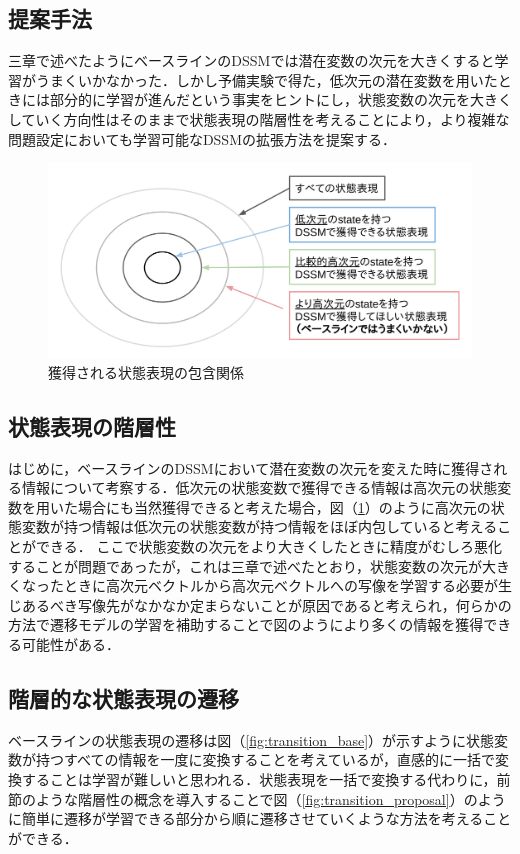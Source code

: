\documentclass[10pt, twocolumn]{jarticle}
\begin{document}
\subsection{提案手法}
三章で述べたようにベースラインのDSSMでは潜在変数の次元を大きくすると学習がうまくいかなかった．しかし予備実験で得た，低次元の潜在変数を用いたときには部分的に学習が進んだという事実をヒントにし，状態変数の次元を大きくしていく方向性はそのままで状態表現の階層性を考えることにより，より複雑な問題設定においても学習可能なDSSMの拡張方法を提案する．

\begin{figure}[tp]
  \begin{center}
    \includegraphics[width=\linewidth]{./figures/hierarchical.png}
    \caption{獲得される状態表現の包含関係}
    \label{fig:hierarchical}
  \end{center}
\end{figure}

\subsection{状態表現の階層性}
はじめに，ベースラインのDSSMにおいて潜在変数の次元を変えた時に獲得される情報について考察する．低次元の状態変数で獲得できる情報は高次元の状態変数を用いた場合にも当然獲得できると考えた場合，図（\ref{fig:hierarchical}）のように高次元の状態変数が持つ情報は低次元の状態変数が持つ情報をほぼ内包していると考えることができる．
ここで状態変数の次元をより大きくしたときに精度がむしろ悪化することが問題であったが，これは三章で述べたとおり，状態変数の次元が大きくなったときに高次元ベクトルから高次元ベクトルへの写像を学習する必要が生じあるべき写像先がなかなか定まらないことが原因であると考えられ，何らかの方法で遷移モデルの学習を補助することで図のようにより多くの情報を獲得できる可能性がある．

\subsection{階層的な状態表現の遷移}
ベースラインの状態表現の遷移は図（\ref{fig:transition_base}）が示すように状態変数が持つすべての情報を一度に変換することを考えているが，直感的に一括で変換することは学習が難しいと思われる．状態表現を一括で変換する代わりに，前節のような階層性の概念を導入することで図（\ref{fig:transition_proposal}）のように簡単に遷移が学習できる部分から順に遷移させていくような方法を考えることができる．
\end{document}

